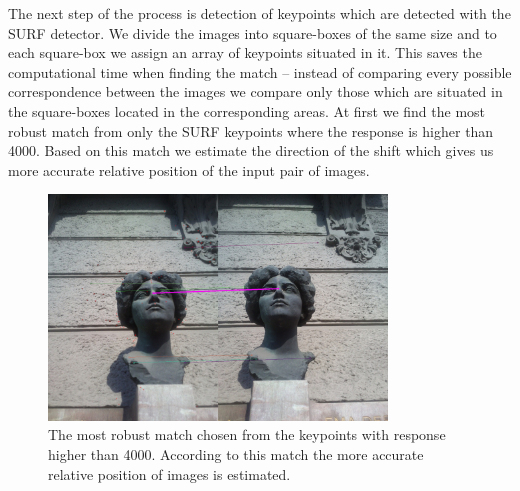 The next step of the process is detection of keypoints which are detected with the SURF detector.
We divide the images into square-boxes of the same size and to each square-box we assign an array of keypoints situated in it.
This saves the computational time when finding the match -- instead of comparing every possible correspondence between the images we compare only those which are situated in the square-boxes located in the corresponding areas.
At first we find the most robust match from only the SURF keypoints where the response is higher than 4000.
Based on this match we estimate the direction of the shift which gives us more accurate relative position of the input pair of images.


\begin{figure}[h]
\centerline{
\includegraphics[width=9cm]{img/ema_direction.png}}
\caption{The most robust match chosen from the keypoints with response higher than 4000. According to this match the more accurate relative position of images is estimated.}
\label{fig:robust_match}
\end{figure}

